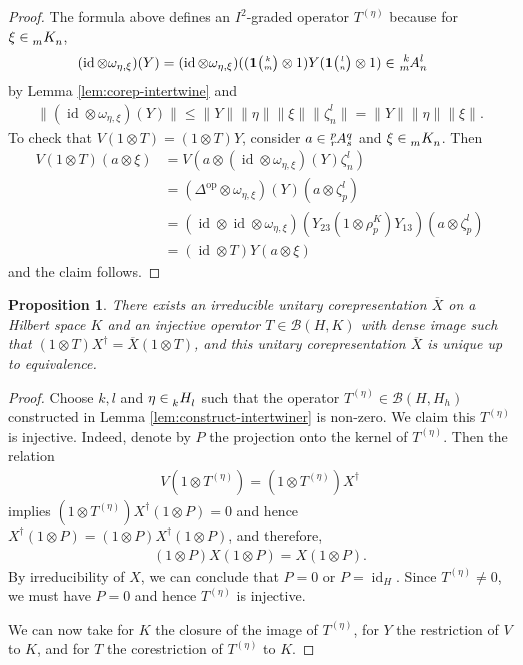 \documentclass[11pt]{article}
\DeclareMathOperator{\id}{id}
\DeclareMathOperator{\op}{\mathrm{op}}
\newcommand{\Grt}[3]{#1{\tiny {\begin{pmatrix} #2\\#3\end{pmatrix}}}}
\newcommand{\UnitC}[2]{\Grt{\mathbf{1}}{#1}{#2}}
\newcommand{\Gr}[5]{\tensor*[^{#2}_{#4}]{#1}{^{#3}_{#5}}}%
\newcommand{\Grd}[3]{\Gr{#1}{}{}{#2}{#3}}
\newtheorem{Prop}[Theorem]{Proposition}
\theoremstyle{definition}
\numberwithin{equation}{section}
\begin{document}
\begin{proof}
The formula above defines an $I^{2}$-graded  operator $T^{(\eta)}$
because  for $\xi \in \Grd{K}{m}{n}$, 
  \begin{align*}
    (\id \otimes \omega_{\eta,\xi})(Y) &=  
    (\id \otimes \omega_{\eta,\xi})((\UnitC{k}{m}\otimes 1)Y(\UnitC{l}{n}\otimes
   1) \in \Gr{A}{k}{l}{m}{n}
  \end{align*}
 by Lemma \ref{lem:corep-intertwine}
  and
  \begin{align*}
   \|    (\id \otimes \omega_{\eta,\xi})(Y)\| \leq
  \|Y\|\|\eta\|\|\xi\|  \| \zeta^{l}_{n}\| =     \|Y\|\|\eta\|\|\xi\|.
  \end{align*}
  To check that $V(1\otimes T)=(1\otimes T)Y$, consider $a \in \Gr{A}{p}{q}{r}{s}$ and
  $\xi \in \Grd{K}{m}{n}$. Then
  \begin{align*}
    V(1\otimes T)(a\otimes \xi)   &= V(a \otimes (\id \otimes
    \omega_{\eta,\xi})(Y)\zeta^{l}_{n}) \\ &=
    (\Delta^{\op} \otimes
    \omega_{\eta,\xi})(Y)(a\otimes \zeta^{l}_{p}) \\
    &=  (\id \otimes \id \otimes
    \omega_{\eta,\xi})(Y_{23}(1 \otimes \rho^{K}_{p})Y_{13})(a\otimes
    \zeta^{l}_{p}) \\
    &= (\id \otimes T)Y(a\otimes \xi)
  \end{align*}
and the claim follows.
\end{proof}


\begin{Prop}
There exists an irreducible unitary corepresentation $\overline{X}$ on a Hilbert
space $K$ and an injective operator $T\in \mathcal{B}(H,K)$  with
dense image such that $(1\otimes
T)X^{\dag} =\overline{X}(1\otimes T)$, and  this unitary corepresentation $\overline{X}$ is unique up to equivalence.
\end{Prop}
\begin{proof}
  Choose $k,l$ and $\eta\in \Grd{H}{k}{l}$ such that the operator $T^{(\eta)} \in
  \mathcal{B}(H,H_{h})$ constructed in Lemma \ref{lem:construct-intertwiner} is non-zero.  We claim
  this $T^{(\eta)}$ is injective.  Indeed, denote by $P$ the projection onto the kernel of
  $T^{(\eta)}$. Then the relation
\begin{align*}
  V(1\otimes T^{(\eta)}) = (1\otimes T^{(\eta)})X^\dag
\end{align*}
implies
$(1 \otimes T^{(\eta)})  X^\dag(1 \otimes P) = 0$
and hence
$X^\dag(1 \otimes P)  = (1 \otimes P)  X^\dag(1 \otimes
P)$, and therefore,
\begin{align*}
  (1 \otimes P)X(1\otimes P) = X(1\otimes P).
\end{align*}
By irreducibility of $X$, we can conclude that $P=0$ or
$P=\id_{H}$. Since $T^{(\eta)}\neq 0$, we must have $P=0$ and hence
$T^{(\eta)}$ is injective. 

We can now take for $K$ the closure of the image of $T^{(\eta)}$, for
$Y$ the restriction of $V$ to $K$,  and
for $T$ the corestriction of $T^{(\eta)}$ to $K$.
\end{proof}
\end{document}
